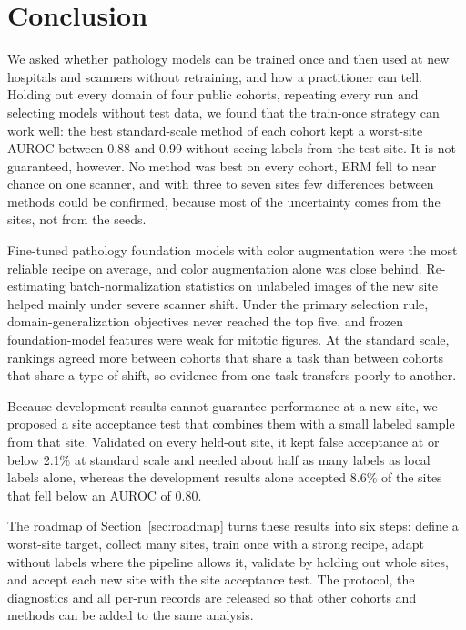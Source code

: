 \section{Conclusion}
\label{sec:conclusion}

We asked whether pathology models can be trained once and then used at new
hospitals and scanners without retraining, and how a practitioner can tell.
Holding out every domain of four public cohorts, repeating every run and
selecting models without test data, we found that the train-once strategy can
work well: the best standard-scale method of each cohort kept a worst-site
AUROC between 0.88 and 0.99 without seeing labels from the test site. It is
not guaranteed, however. No method was best on every cohort, ERM fell to near
chance on one scanner, and with three to seven sites few differences between
methods could be confirmed, because most of the uncertainty comes from the
sites, not from the seeds.

Fine-tuned pathology foundation models with color augmentation were the most
reliable recipe on average, and color augmentation alone was close behind.
Re-estimating batch-normalization statistics on unlabeled images of the new
site helped mainly under severe scanner shift. Under the primary selection
rule, domain-generalization objectives never reached the top five, and frozen
foundation-model features were weak for mitotic figures. At the standard
scale, rankings agreed more between cohorts that share a task than between
cohorts that share a type of shift, so evidence from one task transfers poorly
to another.

Because development results cannot guarantee performance at a new site, we
proposed a site acceptance test that combines them with a small labeled sample
from that site. Validated on every held-out site, it kept false acceptance at
or below 2.1\% at standard scale and needed about half as many labels as local
labels alone, whereas the development results alone accepted 8.6\% of the
sites that fell below an AUROC of 0.80.

The roadmap of Section~\ref{sec:roadmap} turns these results into six steps:
define a worst-site target, collect many sites, train once with a strong
recipe, adapt without labels where the pipeline allows it, validate by holding
out whole sites, and accept each new site with the site acceptance test. The
protocol, the diagnostics and all per-run records are released so that other
cohorts and methods can be added to the same analysis.
